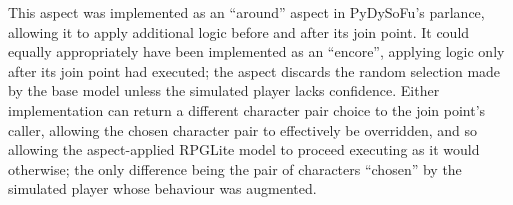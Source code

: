 This aspect was implemented as an ``around'' aspect in PyDySoFu's parlance,
allowing it to apply additional logic before and after its join point. It could
equally appropriately have been implemented as an ``encore'', applying logic
only after its join point had executed; the aspect discards the random selection
made by the base model unless the simulated player lacks confidence. Either
implementation can return a different character pair choice to the join point's
caller, allowing the chosen character pair to effectively be overridden, and so
allowing the aspect-applied RPGLite model to proceed executing as it would
otherwise; the only difference being the pair of characters ``chosen'' by the
simulated player whose behaviour was augmented.







